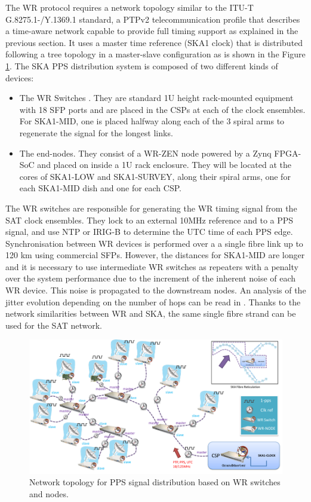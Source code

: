 The WR protocol requires a network topology similar to the ITU-T 
G.8275.1-\allowbreak /Y.1369.1 standard, a PTPv2 telecommunication profile that
describes a time-aware network capable to provide full timing support
\cite{itu:TG8275_1_Y_1369_1} as explained in the previous section. It uses a master time reference (SKA1 clock) that is distributed following a tree topology in a master-slave configuration as is shown in the Figure \ref{fig:ska_pps_dist_network}. The SKA PPS distribution system is composed of two different kinds of devices:

\begin{itemize} 
	\item {The WR Switches \cite{sevensols:wr_switch}. They are standard 1U height rack-mounted equipment with 18 SFP ports and are placed in the CSPs at each of the clock ensembles. For SKA1-MID, one is placed halfway along each of the 3 spiral arms to regenerate the signal for the longest links.} \item{The end-nodes. They consist of a WR-ZEN node \cite{sevensols:wr_zen} powered by a Zynq FPGA-SoC and placed on inside a 1U rack enclosure. They will be located at the cores of SKA1-LOW and SKA1-SURVEY, along their spiral arms, one for each SKA1-MID dish and one for each CSP.} 
\end{itemize}

The WR switches are responsible for generating the WR timing signal from the
SAT clock ensembles. They lock to an external 10MHz reference and to a PPS
signal, and use NTP or IRIG-B to determine the UTC time of each PPS edge.
Synchronisation between WR devices is performed over a a single fibre link up
to 120 km using commercial SFPs.  However, the distances for SKA1-MID are
longer and it is necessary to use intermediate WR switches as repeaters with a
penalty over the system performance due to the increment of the inherent noise of
each WR device. This noise is propagated to the downstream nodes. An analysis of
the jitter evolution depending on the number of hops can be read in
\cite{torres2016scalability}. Thanks to the network similarities between WR and
SKA, the same single fibre strand can be used for the SAT network. 

\begin{figure}[H] \centering \includegraphics[scale=0.4]{img/ska_pps_network}
\caption{Network topology for PPS signal distribution based on WR switches and
nodes. }
\label{fig:ska_pps_dist_network} \end{figure}

